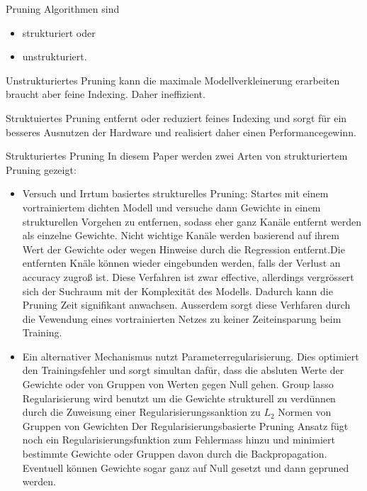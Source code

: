 \documentclass[10pt]{beamer}
\begin{document}
\begin{frame}{}
Pruning Algorithmen sind
\begin{itemize}
 \item strukturiert oder
 \item unstrukturiert.
\end{itemize}
Unstrukturiertes Pruning kann die maximale Modellverkleinerung erarbeiten braucht aber feine Indexing. Daher ineffizient.

Struktuiertes Pruning entfernt oder reduziert feines Indexing und sorgt für ein besseres Ausnutzen der Hardware und realisiert daher einen Performancegewinn.
\end{frame}


\begin{frame}[allowframebreaks]{Strukturiertes Pruning}
In diesem Paper werden zwei Arten von strukturiertem Pruning gezeigt:
\begin{itemize}
 \item Versuch und Irrtum basiertes strukturelles Pruning: Startes mit einem vortrainiertem dichten Modell und versuche dann Gewichte in einem strukturellen Vorgehen zu entfernen, sodass eher ganz Kanäle entfernt werden als einzelne Gewichte. Nicht wichtige Kanäle werden basierend auf ihrem Wert der Gewichte oder wegen Hinweise durch die Regression entfernt.Die entfernten Knäle können wieder eingebunden werden, falls der Verlust an accuracy zugroß ist. Diese Verfahren ist zwar effective, allerdings vergrössert sich der Suchraum mit der Komplexität des Modells. Dadurch kann die Pruning Zeit signifikant anwachsen. Ausserdem sorgt diese Verhfaren durch die Vewendung eines vortrainierten Netzes zu keiner Zeiteinsparung beim Training.
    \item Ein alternativer Mechanismus nutzt Parameterregularisierung. Dies optimiert den Trainingsfehler und sorgt simultan dafür, dass die absluten Werte der Gewichte oder von Gruppen von Werten gegen Null gehen.  Group lasso Regularisierung wird benutzt um die Gewichte strukturell zu verdünnen durch die Zuweisung einer Regularisierungssanktion zu $L_2$ Normen von Gruppen von Gewichten Der Regularisierungsbasierte Pruning Ansatz fügt noch ein Regularisierungsfunktion zum Fehlermass hinzu und minimiert bestimmte Gewichte oder Gruppen davon durch die Backpropagation. Eventuell können Gewichte sogar ganz auf Null gesetzt und dann gepruned werden.

 \end{itemize}
\end{frame}
\end{document}
